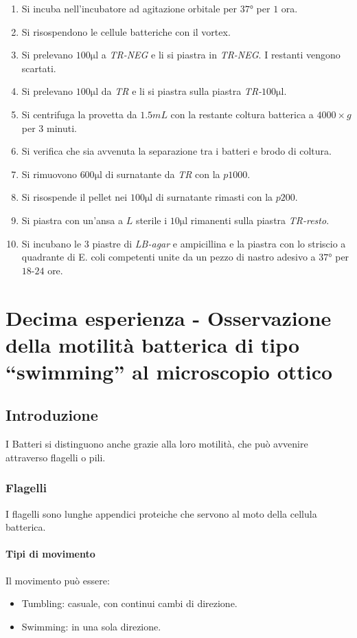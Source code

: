 \begin{enumerate}
			\item Si incuba nell'incubatore ad agitazione orbitale per $37\si{\degree}$ per $1$ ora.
			\item Si risospendono le cellule batteriche con il vortex.
			\item Si prelevano $100\si{\micro\litre}$ a \emph{TR-NEG} e li si piastra in \emph{TR-NEG}.
				I restanti vengono scartati.
			\item Si prelevano $100\si{\micro\litre}$ da \emph{TR} e li si piastra sulla piastra \emph{TR-$100\si{\micro\litre}$}.
			\item Si centrifuga la provetta da $1.5\si{mL}$ con la restante coltura batterica a $4000\times g$ per $3$ minuti.
			\item Si verifica che sia avvenuta la separazione tra i batteri e brodo di coltura.
			\item Si rimuovono $600\si{\micro\litre}$ di surnatante da \emph{TR} con la $p1000$.
			\item Si risospende il pellet nei $100\si{\micro\litre}$ di surnatante rimasti con la $p200$.
			\item Si piastra con un'ansa a $L$ sterile i $10\si{\micro\litre}$ rimanenti sulla piastra \emph{TR-resto}.
			\item Si incubano le $3$ piastre di \emph{LB-agar} e ampicillina e la piastra con lo striscio a quadrante di E. coli competenti unite da un pezzo di nastro adesivo a $37\si{\degree}$ per $18$-$24$ ore.
		\end{enumerate}
				

\section{Decima esperienza - Osservazione della motilit\`a batterica di tipo ``swimming'' al microscopio ottico}

	\subsection{Introduzione}
	I Batteri si distinguono anche grazie alla loro motilit\`a, che pu\`o avvenire attraverso flagelli o pili.

		\subsubsection{Flagelli}
		I flagelli sono lunghe appendici proteiche che servono al moto della cellula batterica.
							
			\paragraph{Tipi di movimento}
			Il movimento pu\`o essere:
			\begin{multicols}{2}
				\begin{itemize}
					\item Tumbling: casuale, con continui cambi di direzione.
					\item Swimming: in una sola direzione.
				\end{itemize}
			\end{multicols}

